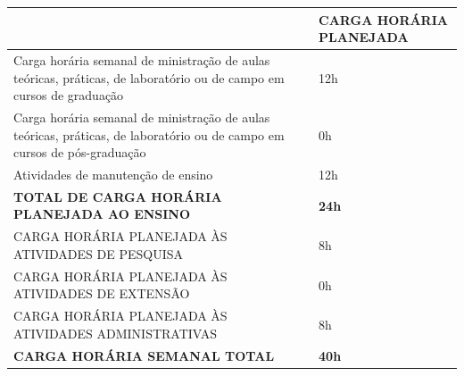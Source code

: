 \documentclass[10pt,a4paper]{article}
\begin{document}
\vspace{0.1em}

\renewcommand{\arraystretch}{1.2}
\begin{tabular}{M{12.1cm} C{4cm}}
  \toprule
   & \textbf{CARGA HORÁRIA PLANEJADA} \\
  \midrule
  {\small Carga horária semanal de ministração de aulas teóricas, práticas, de laboratório ou de campo em cursos de graduação} & 12h \\
  \midrule
  {\small Carga horária semanal de ministração de aulas teóricas, práticas, de laboratório ou de campo em cursos de pós-graduação} & 0h \\
  \midrule
  {\small Atividades de manutenção de ensino} & 12h \\
  \midrule
  \textbf{TOTAL DE CARGA HORÁRIA PLANEJADA AO ENSINO} & \textbf{24h} \\
  \midrule
  {\small CARGA HORÁRIA PLANEJADA ÀS ATIVIDADES DE PESQUISA} & 8h \\
  \midrule
  {\small CARGA HORÁRIA PLANEJADA ÀS ATIVIDADES DE EXTENSÃO} & 0h \\
  \midrule
  {\small CARGA HORÁRIA PLANEJADA ÀS ATIVIDADES ADMINISTRATIVAS} & 8h \\
  \midrule
  \textbf{CARGA HORÁRIA SEMANAL TOTAL} & \textbf{40h} \\
  \bottomrule
\end{tabular}
\end{document}
